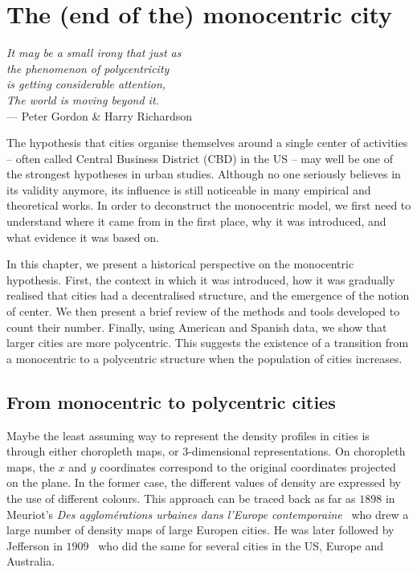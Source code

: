%
\chapter{The (end of the) monocentric city}
\label{chap:monocentric_introduction}

\begin{flushright}{\slshape    
It may be a small irony that  
just as\\
the phenomenon of polycentricity\\ is getting considerable attention,\\
The world is moving beyond it.} \\ \medskip
--- Peter Gordon \& Harry Richardson~\cite{Gordon:1996}
\end{flushright}


\bigskip


The hypothesis that cities organise themselves around a single center of
activities -- often called Central Business District (CBD) in the US -- may well
be one of the strongest hypotheses in urban studies. Although no one seriously
believes in its validity anymore, its influence is still noticeable in many empirical and theoretical works.  In order to deconstruct the
monocentric model, we first need to understand where it came from in the first
place, why it was introduced, and what evidence it was based on. 

In this chapter, we present a historical perspective on the monocentric
hypothesis. First, the context in which it was introduced, how it was gradually
realised that cities had a decentralised structure, and the emergence of the
notion of center. We then present a brief review of the methods and tools
developed to count their number. Finally, using American and Spanish data, we
show that larger cities are more polycentric. This suggests the existence of a
transition from a monocentric to a polycentric structure when the population of
cities increases.

\section{From monocentric to polycentric cities}
\label{sec:introduction}

Maybe the least assuming way to represent the density profiles in cities is
through either choropleth maps, or 3-dimensional representations. On choropleth
maps, the $x$ and $y$ coordinates correspond to the original coordinates
projected on the plane. In the former case, the different values of density are
expressed by the use of different colours. This approach can be traced back as
far as $1898$ in Meuriot's \emph{Des agglom\'erations urbaines dans l'Europe
contemporaine}~\cite{Meuriot:1898} who drew a large number of density maps of
large Europen cities. He was later followed by Jefferson in
$1909$~\cite{Jefferson:1909} who did the same for several cities in the US,
Europe and Australia.\\


